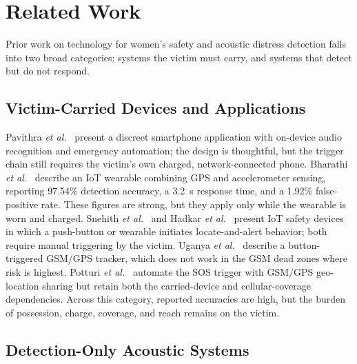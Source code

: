 \documentclass[journal]{IEEEtran}
\begin{document}
\section{Related Work}
\label{sec:related}

Prior work on technology for women's safety and acoustic distress detection
falls into two broad categories: systems the victim must carry, and systems
that detect but do not respond.

\subsection{Victim-Carried Devices and Applications}

Pavithra \emph{et al.}~\cite{pavithra2026} present a discreet smartphone
application with on-device audio recognition and emergency automation; the
design is thoughtful, but the trigger chain still requires the victim's own
charged, network-connected phone. Bharathi \emph{et
al.}~\cite{bharathi2025} describe an IoT wearable combining GPS and
accelerometer sensing, reporting 97.54\% detection accuracy, a 3.2~s
response time, and a 1.92\% false-positive rate. These figures are strong,
but they apply only while the wearable is worn and charged. Snehith
\emph{et al.}~\cite{snehith2025} and Hadkar \emph{et al.}~\cite{hadkar2024}
present IoT safety devices in which a push-button or wearable initiates
locate-and-alert behavior; both require manual triggering by the victim.
Uganya \emph{et al.}~\cite{uganya2023} describe a button-triggered GSM/GPS
tracker, which does not work in the GSM dead zones where risk is
highest. Potturi \emph{et al.}~\cite{potturi2026} automate the SOS trigger
with GSM/GPS geo-location sharing but retain both the carried-device and
cellular-coverage dependencies. Across this category, reported accuracies are
high, but the burden of possession, charge, coverage, and reach remains on
the victim.

\subsection{Detection-Only Acoustic Systems}
\end{document}
